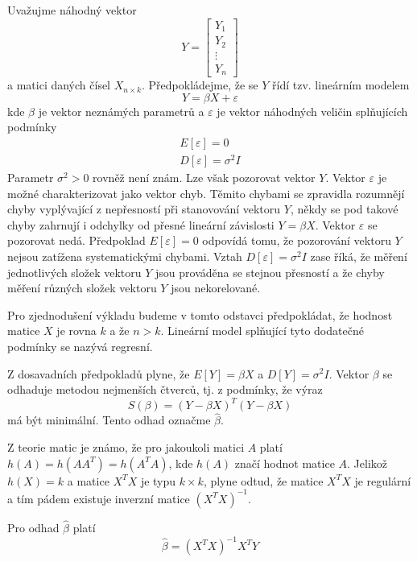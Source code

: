 \documentclass[a4paper]{book}
\begin{document}
Uvažujme náhodný vektor
\begin{equation*}
Y =
\begin{bmatrix}
Y_1 \\
Y_2 \\
\vdots \\
Y_n
\end{bmatrix}
\end{equation*}
a matici daných čísel $X_{n \times k}$. Předpokládejme, že se $Y$ řídí tzv. lineárním modelem
\begin{equation*}
Y = \beta X + \varepsilon
\end{equation*}
kde $\beta$ je vektor neznámých parametrů a $\varepsilon$ je vektor náhodných veličin splňujících podmínky
\begin{gather*}
E[\varepsilon] = 0 \\
D[\varepsilon] = \sigma^2 I
\end{gather*}
Parametr $\sigma^2 > 0$ rovněž není znám. Lze však pozorovat vektor $Y$. Vektor $\varepsilon$ je možné charakterizovat jako vektor chyb. Těmito chybami se zpravidla rozumnějí chyby vyplývající z nepřesností při stanovování vektoru $Y$, někdy se pod takové chyby zahrnují i odchylky od přesné lineární závislosti $Y = \beta X$. Vektor $\varepsilon$ se pozorovat nedá. Předpoklad $E[\varepsilon] = 0$ odpovídá tomu, že pozorování vektoru $Y$ nejsou zatížena systematickými chybami. Vztah $D[\varepsilon] = \sigma^2 I$ zase říká, že měření jednotlivých složek vektoru $Y$ jsou prováděna se stejnou přesností a že chyby měření různých složek vektoru $Y$ jsou nekorelované.

Pro zjednodušení výkladu budeme v tomto odstavci předpokládat, že hodnost matice $X$ je rovna $k$ a že $n > k$. Lineární model splňující tyto dodatečné podmínky se nazývá regresní.

Z dosavadních předpokladů plyne, že $E[Y] = \beta X$ a $D[Y] = \sigma^2 I$. Vektor $\beta$ se odhaduje metodou nejmenších čtverců, tj. z podmínky, že výraz
\begin{equation*}
S(\beta) = (Y - \beta X)^T(Y - \beta X)
\end{equation*}
má být minimální. Tento odhad označme $\hat{\beta}$.

Z teorie matic je známo, že pro jakoukoli matici $A$ platí $h(A) = h(AA^T) = h(A^TA)$, kde $h(A)$ značí hodnot matice $A$. Jelikož $h(X) = k$ a matice $X^TX$ je typu $k \times k$, plyne odtud, že matice $X^TX$ je regulární a tím pádem existuje inverzní matice $(X^TX)^{-1}$.

Pro odhad $\hat{\beta}$ platí
\begin{equation*}
\hat{\beta} = (X^TX)^{-1}X^TY
\end{equation*}
\end{document}
